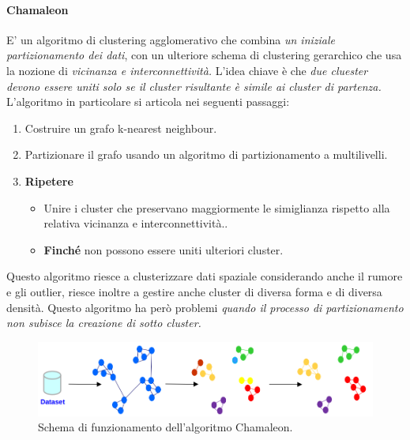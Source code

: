 \paragraph{Chamaleon} E' un algoritmo di clustering agglomerativo che combina \textit{un iniziale partizionamento dei dati}, con un ulteriore schema di clustering gerarchico che usa la nozione di \textit{vicinanza e interconnettività.} L'idea chiave è che \textit{due cluester devono essere uniti solo se il cluster risultante è simile ai cluster di partenza.}
L'algoritmo in particolare si articola nei seguenti passaggi:
\begin{enumerate}
	\item Costruire un grafo k-nearest neighbour.
	\item Partizionare il grafo usando un algoritmo di partizionamento a multilivelli.
	\item \textbf{Ripetere}
	\begin{itemize}
		\item Unire i cluster che preservano maggiormente le simiglianza rispetto alla relativa vicinanza e interconnettività..
		\item \textbf{Finché} non possono essere uniti ulteriori cluster.
	\end{itemize}
	
\end{enumerate}

Questo algoritmo riesce a clusterizzare dati spaziale considerando anche il rumore e gli outlier, riesce inoltre a gestire anche cluster di diversa forma e di diversa densità. Questo algoritmo ha però problemi \textit{quando il processo di partizionamento non subisce la creazione di sotto cluster.}
\begin{figure}[H]
	\centering
	\includegraphics[height=0.18 \linewidth]{clustering/pict/chamaleon.png}
	\caption{Schema di funzionamento dell'algoritmo Chamaleon.}
\end{figure}

